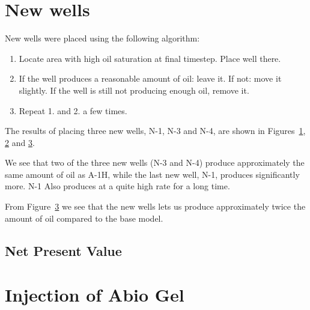 \documentclass[final]{beamer}
\begin{document}
\begin{frame}[t]
\begin{multicols}{3}
\section{New wells}
New wells were placed using the following algorithm:
\begin{enumerate}
  \item Locate area with high oil saturation at final timestep. Place well there.
  \item If the well produces a reasonable amount of oil: leave it. If not: move it slightly. If the well is still not producing enough oil, remove it.
  \item Repeat 1. and 2. a few times.
\end{enumerate}
The results of placing three new wells, N-1, N-3 and N-4, are shown in Figures~\ref{fig:new_wells_wopt}, \ref{fig:new_wells_wopr} and \ref{fig:new_wells_field}.

We see that two of the three new wells (N-3 and N-4) produce approximately the same amount of oil as A-1H, while the last new well, N-1, produces significantly more. N-1 Also produces at a quite high rate for a long time.

From Figure~\ref{fig:new_wells_field} we see that the new wells lets us produce approximately twice the amount of oil compared to the base model.

\begin{figure}[H]
  \hspace{-5ex}
  \caption{}
  \label{fig:new_wells_wopt}
\end{figure}

\begin{figure}[H]
  \hspace{-5ex}
  \caption{}
  \label{fig:new_wells_wopr}
\end{figure}


\begin{figure}[H]
  
  \caption{}
  \label{fig:new_wells_field}
\end{figure}


\subsection{Net Present Value} %










\section{Injection of Abio Gel} %


\end{multicols}
\end{frame}
\end{document}
